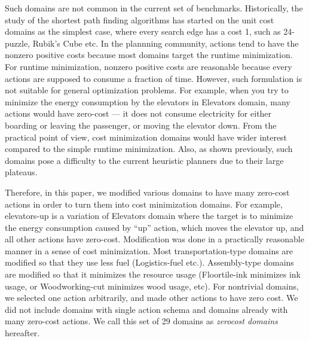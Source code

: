
Such domains are
not common in the current set of benchmarks.
% 
Historically, the study of the shortest path finding algorithms has
started on the unit cost domains as the simplest case, where every
search edge has a cost 1,
such as 24-puzzle, Rubik's Cube etc.
% 
In the plannning community,
actions tend to have the nonzero positive costs
because most domains target the runtime minimization.
For runtime minimization,
nonzero positive costs are reasonable because
every actions are supposed to consume a fraction of time.
However, such formulation is not suitable for general optimization
problems.  For example, when you try to minimize the energy consumption
by the elevators in Elevators domain, many actions would have zero-cost
--- it does not consume electricity for either boarding or leaving the
passenger, or moving the elevator down.
% 
From the practical point of
view, cost minimization domains would have wider interest compared to
the simple runtime minimization.
Also, as shown previously, such domains pose a
difficulty to the current heuristic planners due to their large plateaus.

Therefore, in this paper, we modified various domains to have many
zero-cost actions in order to turn them into cost minimization domains.
For example, elevators-up is a variation of
Elevators domain where the target is to minimize
the energy consumption caused by ``up'' action, which moves the elevator
up, and all other actions have zero-cost.  Modification was done in a
practically reasonable manner in a sense of cost minimization. Most
transportation-type domains are modified so that they use less
fuel (Logistics-fuel etc.). Assembly-type domains are modified so that it minimizes the
resource usage (Floortile-ink minimizes ink usage, or Woodworking-cut
minimizes wood usage, etc). For nontrivial domains, we selected one action
arbitrarily, and made other actions to have zero cost. We did not
include domains with single action schema and domains already with many
zero-cost actions.
We call this set of 29 domains as \emph{zerocost domains} hereafter.

